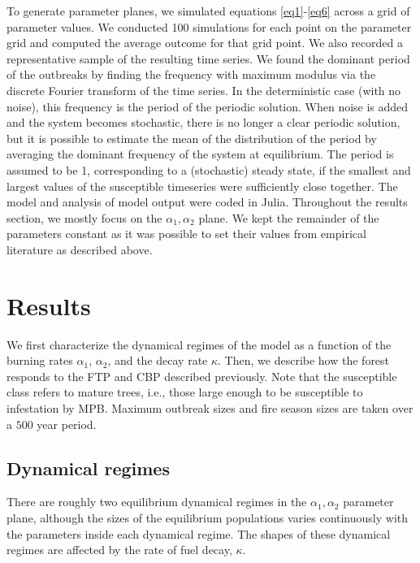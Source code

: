 To generate parameter planes, we simulated equations \ref{eq1}-\ref{eq6} across a grid of parameter values.  We conducted 100 simulations for each point on the parameter grid and computed the average outcome for that grid point.  We also recorded a representative sample of the resulting time series. We found the dominant period of the outbreaks by finding the frequency with maximum modulus via the discrete Fourier transform of the time series. In the deterministic case (with no noise), this frequency is the period of the periodic solution. When noise is added and the system becomes stochastic, there is no longer a clear periodic solution, but it is possible to estimate the mean of the distribution of the period by averaging the dominant frequency of the system at equilibrium. The period is assumed to be 1, corresponding to a (stochastic) steady state, if the smallest and largest values of the susceptible timeseries were sufficiently close together. The model and analysis of model output were coded in Julia. Throughout the results section, we mostly focus on the $\alpha_1,\alpha_2$ plane. We kept the remainder of the parameters constant as it was possible to set their values from empirical literature as described above.

\section{Results}
We first characterize the dynamical regimes of the model as a function of the burning rates $\alpha_1$, $\alpha_2$, and the decay rate $\kappa$. Then, we describe how the forest responds to the FTP and CBP described previously. Note that the susceptible class refers to mature trees, i.e., those large enough to be susceptible to infestation by MPB. Maximum outbreak sizes and fire season sizes are taken over a $500$ year period.

\subsection{Dynamical regimes}

There are roughly two equilibrium dynamical regimes in the $\alpha_1, \alpha_2$ parameter plane, although the sizes of the equilibrium populations varies continuously with the parameters inside each dynamical regime. The shapes of these dynamical regimes are affected by the rate of fuel decay, $\kappa$. 


